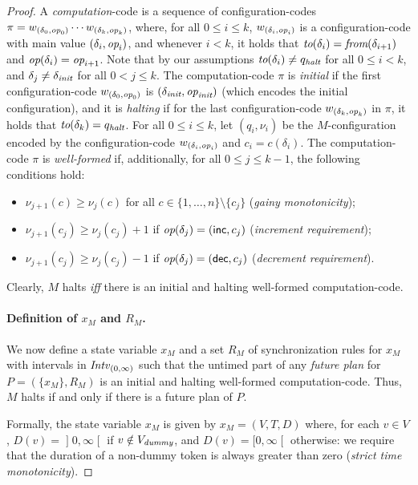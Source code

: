 \begin{proof}
A \emph{computation}-code is a sequence of configuration-codes $\pi= w_{(\delta_0 ,{\textit{op}}_0)} \cdots\allowbreak w_{(\delta_k,{\textit{op}}_k)}$, where,  for all $0\leq i\leq k$, $w_{(\delta_i,{\textit{op}}_i)}$ is a configuration-code with main value $(\delta_i,{\textit{op}}_i)$, and whenever
  $i<k$, it holds that ${\textit{to}}(\delta_i)={\textit{from}}(\delta_{i+1})$ and ${\textit{op}}(\delta_i)={\textit{op}}_{i+1}$. Note that by our assumptions ${\textit{to}}(\delta_i)\neq q_{\textit{halt}}$ for all $0\leq i<k$, and
  $\delta_j\neq \delta_{\textit{init}}$ for all $0<j\leq k$.
  The computation-code $\pi$ is \emph{initial} if  the first configuration-code $w_{(\delta_0 ,{\textit{op}}_0)}$ is $(\delta_{\textit{init}},{\textit{op}}_{\textit{init}})$ (which encodes the initial configuration), and it is \emph{halting} if
  for the last  configuration-code $w_{(\delta_k,{\textit{op}}_k)}$ in $\pi$, it holds that ${\textit{to}}(\delta_k)=q_{\textit{halt}}$.
%
For all $0\leq i\leq k$, let $(q_i,\nu_i)$ be the $M$-configuration encoded by the configuration-code $w_{(\delta_i,{\textit{op}}_i)}$ and $c_i= c(\delta_i)$.
 The computation-code $\pi$ is \emph{well-formed} if, additionally,   for all $0\leq j\leq k-1$, the following conditions hold:
%
\begin{itemize}
  \item $\nu_{j+1}(c)\geq \nu_j(c)$ for all $c\in \{1,\ldots,n\}\setminus \{c_j\}$ (\emph{gainy monotonicity});
\item $\nu_{j+1}(c_j)\geq \nu_j(c_j)+1$ if ${\textit{op}}(\delta_j)= ({\mathsf{inc}},c_j)$ (\emph{increment requirement});
 \item $\nu_{j+1}(c_j)\geq \nu_j(c_j)-1$ if ${\textit{op}}(\delta_j)= ({\mathsf{dec}},c_j)$ (\emph{decrement requirement}).
\end{itemize}
%
Clearly, %
$M$ halts \emph{iff} there is an initial and halting well-formed computation-code. %

\paragraph*{Definition of $x_M$ and $R_M$.} We now define a state variable $x_M$ and a set $R_M$ of  synchronization rules for $x_M$ with intervals in ${\mathit{Intv}}_{(0,\infty)}$ such that the untimed part of any \emph{future plan} for $P=(\{x_M\},R_M)$
is an initial and halting well-formed computation-code. Thus, $M$ halts if and only if there is a future plan of $P$.

Formally, the state 
variable $x_M$ is given by $x_M= (V,T,D)$ where, for each $v\in V$,
$D(v)=\mathopen]0,\infty\mathclose[$ if $v\notin V_{{\textit{dummy}}}$, and $D(v)=\mathopen[0,\infty\mathclose[$ otherwise: we require that the duration of a non-dummy token %
is always greater than zero (\emph{strict time monotonicity}).


\end{proof}
